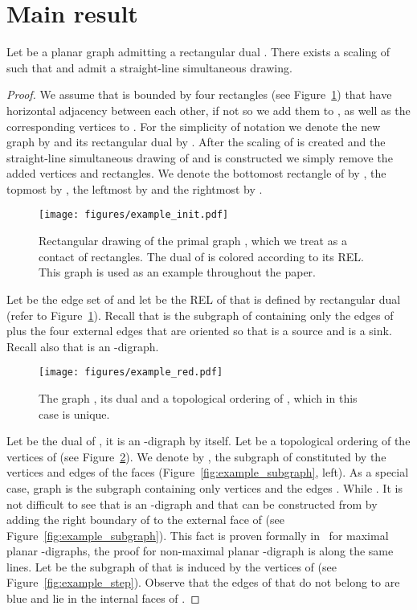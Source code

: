 \documentclass{llncs}
\begin{document}
\section{Main result}
\label{sec:main}

\begin{theorem}
Let  be a planar graph admitting a rectangular dual . There exists a scaling  of  such that  and  admit a  straight-line simultaneous drawing.
\end{theorem}

\begin{proof}

We assume that  is bounded by four rectangles (see Figure~\ref{fig:example_init}) that have horizontal adjacency between each other, if not so we add them to , as well as the corresponding vertices to .   For the simplicity of notation we denote the new graph by  and its rectangular dual by . After the scaling  of  is created and the straight-line simultaneous drawing of  and   is constructed we simply remove the added vertices and rectangles. We denote the bottomost rectangle of  by , the topmost by , the leftmost by  and the rightmost by .  
 
\begin{figure}[htb]
\centering
\texttt{[image: figures/example\_init.pdf]}
\caption{Rectangular drawing  of the primal graph , which we treat as a contact of rectangles. The dual   of  is colored according to its REL. This graph is used as an example throughout the paper.}
\label{fig:example_init}
\end{figure} 
 
Let   be the edge set of  and let  be the REL of  that is defined by rectangular dual  (refer to Figure~\ref{fig:example_init}).  Recall that  is the subgraph of  containing only the edges of  plus the four external edges that are oriented so that  is a source and  is a sink. Recall also that    is an -digraph. 


\begin{figure}[htb]
\centering
\texttt{[image: figures/example\_red.pdf]}
\caption{ The graph , its dual  and a topological ordering of , which in this case is unique. }
\label{fig:example_red}
\end{figure}

Let  be the  dual of , it is an -digraph by itself. Let  be a topological ordering of the vertices of   (see Figure~\ref{fig:example_red}). We denote by ,  the subgraph of  constituted by the vertices and edges of the faces  (Figure~\ref{fig:example_subgraph}, left). As a special case, graph  is the subgraph containing only vertices  and the edges . While .   It is not difficult to see that  is an -digraph and that   can be constructed from  by adding the right boundary of  to the external face of  (see Figure~\ref{fig:example_subgraph}). This fact is proven formally in~\cite[Lemma 4]{GiordanoLMSW15} for maximal planar -digraphs, the proof for non-maximal planar -digraph is along the same lines.   
Let  be the subgraph of  that is induced by the vertices of  
   (see Figure~\ref{fig:example_step}). Observe that the edges of  that do not belong to  are blue and lie in the internal faces of .


\end{proof}
\end{document}
